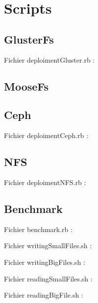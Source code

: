 \documentclass[12pt]{report}
\begin{document}
		\chapter{Scripts}
			\section{GlusterFs}
				Fichier deploimentGluster.rb :
				
			\section{MooseFs}
			\section{Ceph}
			  Fichier deploimentCeph.rb :
				
			\section{NFS}
			  Fichier deploimentNFS.rb :
				
			\section{Benchmark}
				Fichier benchmark.rb :
				

				Fichier writingSmallFiles.sh :
				

				Fichier writingBigFiles.sh :
				

				Fichier readingSmallFiles.sh :
				

				Fichier readingBigFile.sh :
				
\end{document}
